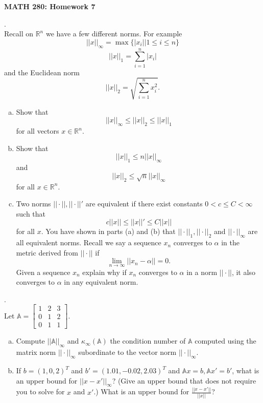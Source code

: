 \documentclass[12 pt]{article}
\begin{document}
\centerline{\bf MATH 280: Homework 7} 
\bigskip

. \\
Recall on $\mathbb{R}^n$ we have a few different norms. For example
$$
||x||_{\infty}=\max\{ |x_i| | 1 \leq i \leq n \}
$$
$$
||x||_{1}=\sum_{i=1}^n |x_i| 
$$
and the Euclidean norm 
$$
||x||_{2}=\sqrt{\sum_{i=1}^n x_i^2}.
$$
\begin{enumerate}[a)]
\item 
Show that $$||x||_{\infty} \leq ||x||_2 \leq ||x||_1$$ for all vectors $x
\in \mathbb{R}^n$. 

\item
Show that $$||x||_1 \leq n ||x||_{\infty}$$ and $$||x||_2 \leq \sqrt{n} ||x||_{\infty}$$ for all $x \in \mathbb{R}^n$. 

\item
Two norms $||\cdot||, ||\cdot||'$ are equivalent if there exist constants $0 < c \leq C < \infty$ such that 
$$c||x|| \leq ||x||' \leq C||x||$$ for all $x$. You have shown in parts (a) and (b) that $||\cdot||_1, ||\cdot||_2$ and $||\cdot||_{\infty}$ 
are all equivalent norms. Recall we say a sequence $x_n$ converges to $\alpha$ in the metric derived from $|| \cdot ||$ if 
$$ \lim_{n \to \infty} ||x_n - \alpha|| = 0.$$ 
Given a sequence $x_n$ explain why if $x_n$ converges to $\alpha$ in a norm $|| \cdot ||$, it also converges to $\alpha$ 
in any equivalent norm.
\end{enumerate}
\medskip

.
\\ 
Let $\mathbb{A} = \begin{bmatrix} 1 & 2 & 3 \\ 0 & 1 & 2 \\ 0 & 1 & 1 \end{bmatrix}$. 
\begin{enumerate}[a)]
\item 
Compute $||\mathbb{A}||_{\infty}$ and $\kappa_{\infty}(\mathbb{A})$ the condition number of $\mathbb{A}$ computed 
using the matrix norm $||\cdot ||_{\infty}$ subordinate to the vector norm $|| \cdot ||_{\infty}$. 

\noindent
\item If $b=(1,0,2)^T$ and $b'=(1.01,-0.02, 2.03)^T$ and $\mathbb{A}x=b,
\mathbb{A}x'=b'$, what is an upper bound for $||x-x'||_{\infty}$? (Give an upper bound that does not require you to solve for $x$ and $x'$.) What is an upper bound for $\frac{||x-x'||}{||x||}$?

\end{enumerate}
\medskip
\end{document}
